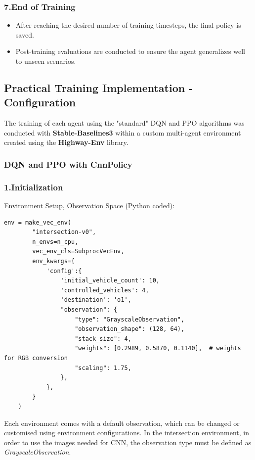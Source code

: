 \subsubsection{7.End of Training}
\begin{itemize}
    \item After reaching the desired number of training timesteps, the final policy is saved.
    \item Post-training evaluations are conducted to ensure the agent generalizes well to unseen scenarios.
\end{itemize}


\newpage

\subsection{Practical Training Implementation - Configuration}

The training of each agent using the "standard" DQN and PPO algorithms was conducted with \textbf{Stable-Baselines3}\cite{stable-baselines3} within 
a custom multi-agent environment created using the \textbf{Highway-Env} library.

\subsubsection{DQN and PPO with CnnPolicy }

\subsubsection{1.Initialization}

Environment Setup, Observation Space (Python coded): 

\begin{lstlisting}[style=python]
    env = make_vec_env(
        "intersection-v0", 
        n_envs=n_cpu, 
        vec_env_cls=SubprocVecEnv, 
        env_kwargs={
            'config':{
                'initial_vehicle_count': 10,
                'controlled_vehicles': 4,
                'destination': 'o1',
                "observation": {
                    "type": "GrayscaleObservation",
                    "observation_shape": (128, 64),
                    "stack_size": 4,
                    "weights": [0.2989, 0.5870, 0.1140],  # weights for RGB conversion
                    "scaling": 1.75,
                },
            },
        }
    )
\end{lstlisting}

Each environment comes with a default observation, which can be changed or customised using environment configurations. 
In the intersection environment, in order to use the images needed for CNN, the observation type must be defined as \textit{GrayscaleObservation}.


